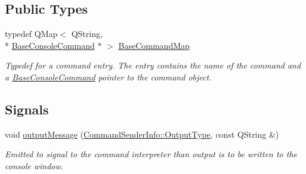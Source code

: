 \subsection*{Public Types}
\begin{DoxyCompactItemize}
\item 
\hypertarget{class_command_manager_aeaf3c1dd9e4132d9263cc6530d7d988f}{typedef Q\-Map$<$ Q\-String, \\*
\hyperlink{class_base_console_command}{Base\-Console\-Command} $\ast$ $>$ \hyperlink{class_command_manager_aeaf3c1dd9e4132d9263cc6530d7d988f}{Base\-Command\-Map}}\label{class_command_manager_aeaf3c1dd9e4132d9263cc6530d7d988f}

\begin{DoxyCompactList}\small\item\em Typedef for a command entry. The entry contains the name of the command and a \hyperlink{class_base_console_command}{Base\-Console\-Command} pointer to the command object. \end{DoxyCompactList}\end{DoxyCompactItemize}
\subsection*{Signals}
\begin{DoxyCompactItemize}
\item 
\hypertarget{class_command_manager_aabd509f2344154ea7996561c3e9f9807}{void \hyperlink{class_command_manager_aabd509f2344154ea7996561c3e9f9807}{output\-Message} (\hyperlink{class_command_sender_info_a3a5e6a2ef1772f6557f351652c2e3b60}{Command\-Sender\-Info\-::\-Output\-Type}, const Q\-String \&)}\label{class_command_manager_aabd509f2344154ea7996561c3e9f9807}

\begin{DoxyCompactList}\small\item\em Emitted to signal to the command interpreter than output is to be written to the console window. \end{DoxyCompactList}\end{DoxyCompactItemize}
